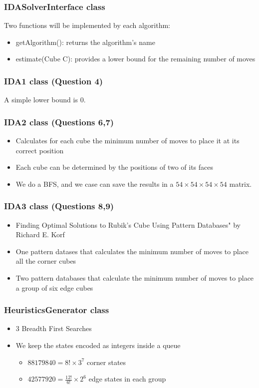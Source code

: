 \documentclass{beamer}
\begin{document}
\begin{frame}
\frametitle{IDASolverInterface class}

Two functions will be implemented by each algorithm:

\begin{itemize}
\item
getAlgorithm(): returns the algorithm's name
\item
estimate(Cube C): provides a lower bound for the remaining number of moves
\end{itemize}
\end{frame}

\begin{frame}
\frametitle{IDA1 class (Question 4)}

A simple lower bound is 0.
\end{frame}

\begin{frame}
\frametitle{IDA2 class (Questions 6,7)}

\begin{itemize}
\item
Calculates for each cube the minimum number of moves to place it at its correct position
\item
Each cube can be determined by the positions of two of its faces
\item
We do a BFS, and we case can save the results in a $54 \times 54 \times 54 \times 54$ matrix.
\end{itemize}
\end{frame}

\begin{frame}
\frametitle{IDA3 class (Questions 8,9)}

\begin{itemize}
\item
Finding Optimal Solutions to Rubik's Cube Using Pattern Databases" by Richard E. Korf

\item
One pattern datases that calculates the minimum number of moves to place all the corner cubes

\item
Two pattern databases that calculate the minimum number of moves to place a group of six edge cubes
\end{itemize}
\end{frame}

\begin{frame}
\frametitle{HeuristicsGenerator class}

\begin{itemize}
\item
3 Breadth First Searches
\item
We keep the states encoded as integers inside a queue

\begin{itemize}
\item
$88179840 = 8! \times 3^7$ corner states
\item
$42577920 = \frac{12!}{6!} \times 2^6$ edge states in each group
\end{itemize}
\end{itemize}
\end{frame}
\end{document}
